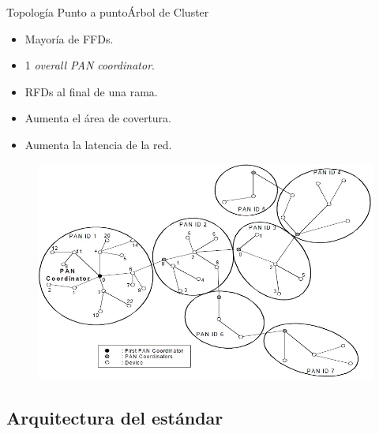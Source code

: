 \documentclass[aspectratio=169, handout]{beamer}
\begin{document}
\begin{frame}{Topología Punto a punto}{Árbol de Cluster}
\begin{minipage}[c]{1.0\linewidth}
\begin{minipage}[c]{0.45\linewidth}
		\begin{itemize}
			\item Mayoría de FFDs.
			\vspace{10px}
			\item 1 \textit{overall PAN coordinator}.
			\vspace{10px}
			\item RFDs al final de una rama.
			\vspace{10px}
			\item Aumenta el área de covertura.
			\vspace{10px}
			\item Aumenta la latencia de la red.
		\end{itemize}	
	\end{minipage}
	\hspace{-15px}
	\begin{minipage}[c]{0.65\linewidth}
		\begin{figure}[H]
			{\includegraphics[width=.8\textwidth]{./imagenes/cluster}}
		\end{figure}	  	  	
	\end{minipage}
\end{minipage}
\end{frame}

\subsection[Arquitectura]{Arquitectura del estándar}
\end{document}
